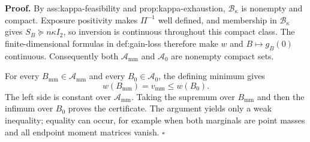 \textbf{Proof.}
By ass:kappa-feasibility and prop:kappa-exhaustion, \(\mathcal B_\kappa\) is nonempty and compact.  Exposure positivity makes \(\Pi^{-1}\) well defined, and membership in \(\mathcal B_\kappa\) gives \(S_B\succeq n\kappa I_2\), so inversion is continuous throughout this compact class.  The finite-dimensional formulas in def:gain-loss therefore make \(w\) and \(B\mapsto g_B(0)\) continuous.  Consequently both \(\mathcal A_{\mathrm{mm}}\) and \(\mathcal A_0\) are nonempty compact sets.

For every \(B_{\mathrm{mm}}\in\mathcal A_{\mathrm{mm}}\) and every \(B_0\in\mathcal A_0\), the defining minimum gives
\[
w(B_{\mathrm{mm}})=v_{\mathrm{mm}}\le w(B_0).
\]
The left side is constant over \(\mathcal A_{\mathrm{mm}}\).  Taking the supremum over \(B_{\mathrm{mm}}\) and then the infimum over \(B_0\) proves the certificate.  The argument yields only a weak inequality; equality can occur, for example when both marginals are point masses and all endpoint moment matrices vanish. \(\square\)